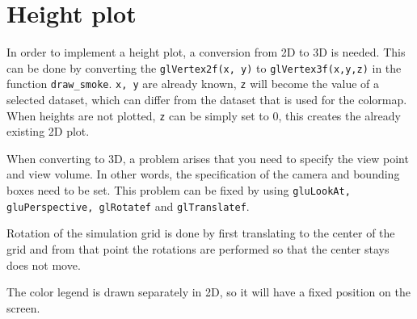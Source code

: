 \section{Height plot}
\label{sec:height_plot}
In order to implement a height plot, a conversion from 2D to 3D is needed.
This can be done by converting the \texttt{glVertex2f(x, y)} to \texttt{glVertex3f(x,y,z)} in the function \texttt{draw\_smoke}.
\texttt{x, y} are already known, \texttt{z} will become the value of a selected dataset, which can differ from the dataset that is used for the colormap.
When heights are not plotted, \texttt{z} can be simply set to 0, this creates the already existing 2D plot.

When converting to 3D, a problem arises that you need to specify the view point and view volume.
In other words, the specification of the camera and bounding boxes need to be set.
This problem can be fixed by using \texttt{gluLookAt, gluPerspective, glRotatef} and \texttt{glTranslatef}.

Rotation of the simulation grid is done by first translating to the center of the grid and from that point the rotations are performed so that the center stays does not move.

The color legend is drawn separately in 2D, so it will have a fixed position on the screen.
